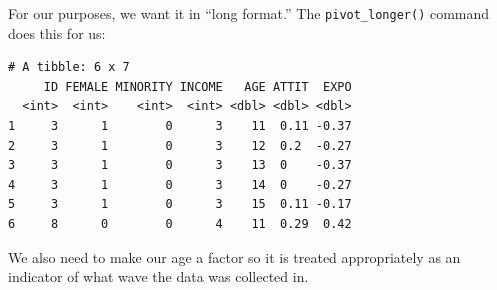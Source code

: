 \documentclass[
  letterpaper,
  DIV=11,
  numbers=noendperiod]{scrreprt}
\newenvironment{Shaded}{}{}
\newcommand{\AttributeTok}[1]{\textcolor[rgb]{0.49,0.56,0.16}{#1}}
\newcommand{\DocumentationTok}[1]{\textcolor[rgb]{0.73,0.13,0.13}{\textit{#1}}}
\newcommand{\FloatTok}[1]{\textcolor[rgb]{0.25,0.63,0.44}{#1}}
\newcommand{\FunctionTok}[1]{\textcolor[rgb]{0.02,0.16,0.49}{#1}}
\newcommand{\NormalTok}[1]{#1}
\newcommand{\OtherTok}[1]{\textcolor[rgb]{0.00,0.44,0.13}{#1}}
\newcommand{\SpecialCharTok}[1]{\textcolor[rgb]{0.25,0.44,0.63}{#1}}
\newcommand{\StringTok}[1]{\textcolor[rgb]{0.25,0.44,0.63}{#1}}
\begin{document}
For our purposes, we want it in ``long format.'' The
\texttt{pivot\_longer()} command does this for us:

\begin{Shaded}
\end{Shaded}

\begin{verbatim}
# A tibble: 6 x 7
     ID FEMALE MINORITY INCOME   AGE ATTIT  EXPO
  <int>  <int>    <int>  <int> <dbl> <dbl> <dbl>
1     3      1        0      3    11  0.11 -0.37
2     3      1        0      3    12  0.2  -0.27
3     3      1        0      3    13  0    -0.37
4     3      1        0      3    14  0    -0.27
5     3      1        0      3    15  0.11 -0.17
6     8      0        0      4    11  0.29  0.42
\end{verbatim}

We also need to make our age a factor so it is treated appropriately as
an indicator of what wave the data was collected in.

\begin{Shaded}
\end{Shaded}
\end{document}
